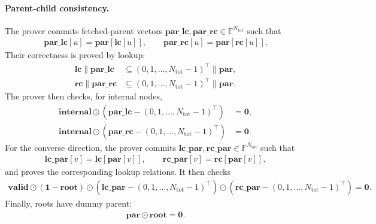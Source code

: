 \paragraph{Parent-child consistency.}
The prover commits fetched-parent vectors
$\mathbf{par\_lc},\mathbf{par\_rc}\in\mathbb{F}^{N_{\mathrm{tot}}}$ such that
\begin{align}
    \mathbf{par\_lc}[u]=\mathbf{par}[\mathbf{lc}[u]],\qquad
    \mathbf{par\_rc}[u]=\mathbf{par}[\mathbf{rc}[u]].
\end{align}
Their correctness is proved by lookup:
\begin{align}
    \mathbf{lc}\|\mathbf{par\_lc}
    &\subseteq
    (0,1,\dots,N_{\mathrm{tot}}-1)^\top\|\mathbf{par},\\
    \mathbf{rc}\|\mathbf{par\_rc}
    &\subseteq
    (0,1,\dots,N_{\mathrm{tot}}-1)^\top\|\mathbf{par}.
\end{align}
The prover then checks, for internal nodes,
\begin{align}
    \mathbf{internal}\odot
    (\mathbf{par\_lc}-(0,1,\dots,N_{\mathrm{tot}}-1)^\top)
    &=\mathbf{0},\\
    \mathbf{internal}\odot
    (\mathbf{par\_rc}-(0,1,\dots,N_{\mathrm{tot}}-1)^\top)
    &=\mathbf{0}.
\end{align}
For the converse direction, the prover commits
$\mathbf{lc\_par},\mathbf{rc\_par}\in\mathbb{F}^{N_{\mathrm{tot}}}$ such that
\begin{align}
    \mathbf{lc\_par}[v]=\mathbf{lc}[\mathbf{par}[v]],\qquad
    \mathbf{rc\_par}[v]=\mathbf{rc}[\mathbf{par}[v]],
\end{align}
and proves the corresponding lookup relations. It then checks
\begin{align}
    \mathbf{valid}\odot(\mathbf{1}-\mathbf{root})\odot
    (\mathbf{lc\_par}-(0,1,\dots,N_{\mathrm{tot}}-1)^\top)
    \odot
    (\mathbf{rc\_par}-(0,1,\dots,N_{\mathrm{tot}}-1)^\top)
    =
    \mathbf{0}.
\end{align}
Finally, roots have dummy parent:
\begin{align}
    \mathbf{par}\odot\mathbf{root}=\mathbf{0}.
\end{align}


